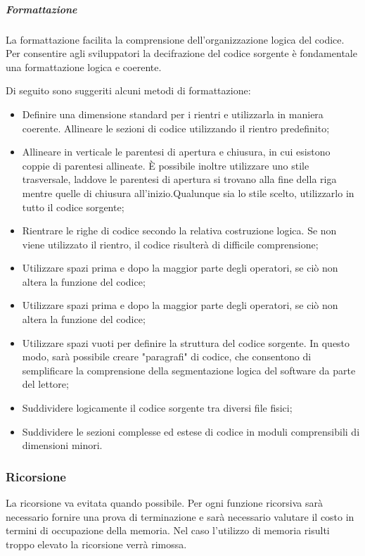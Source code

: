 \subparagraph{Formattazione}
La formattazione facilita la comprensione dell'organizzazione logica del codice. Per consentire agli sviluppatori la decifrazione del codice sorgente è fondamentale una formattazione logica e coerente.

Di seguito sono suggeriti alcuni metodi di formattazione:
\begin{itemize}
\item
Definire una dimensione standard per i rientri e utilizzarla in maniera coerente. Allineare le sezioni di codice utilizzando il rientro predefinito;
\item
Allineare in verticale le parentesi di apertura e chiusura, in cui esistono coppie di parentesi allineate. È possibile inoltre utilizzare uno stile trasversale, laddove le parentesi di apertura si trovano alla fine della riga mentre quelle di chiusura all'inizio.Qualunque sia lo stile scelto, utilizzarlo in tutto il codice sorgente;
\item
Rientrare le righe di codice secondo la relativa costruzione logica. Se non viene utilizzato il rientro, il codice risulterà di difficile comprensione;
\item
Utilizzare spazi prima e dopo la maggior parte degli operatori, se ciò non altera la funzione del codice;
\item
Utilizzare spazi prima e dopo la maggior parte degli operatori, se ciò non altera la funzione del codice;
\item
Utilizzare spazi vuoti per definire la struttura del codice sorgente. In questo modo, sarà possibile creare "paragrafi" di codice, che consentono di semplificare la comprensione della segmentazione logica del software da parte del lettore;
\item
Suddividere logicamente il codice sorgente tra diversi file fisici;
\item
Suddividere le sezioni complesse ed estese di codice in moduli comprensibili di dimensioni minori.
\end{itemize}

\subsubsection{Ricorsione}
La ricorsione va evitata quando possibile. Per ogni funzione ricorsiva sarà necessario fornire una prova di terminazione e sarà necessario valutare il costo in termini di occupazione della memoria. Nel caso l'utilizzo di memoria risulti troppo elevato la ricorsione verrà rimossa.

